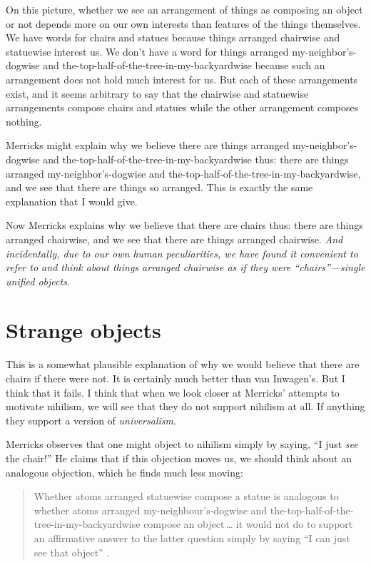 \documentclass[12pt,twoside]{reedfancy}
\begin{document}
\begin{spacing}{1.25}
On this picture, whether we see an arrangement of things as composing
an object or not depends more on our own interests than features of
the things themselves.  We have words for chairs and statues because
things arranged chairwise and statuewise interest us.  We don't have a
word for things arranged my-neighbor's-dogwise and
the-top-half-of-the-tree-in-my-backyardwise because such an
arrangement does not hold much interest for us.  But each of these
arrangements exist, and it seems arbitrary to say that the chairwise
and statuewise arrangements compose chairs and statues while the other
arrangement composes nothing.

Merricks might explain why we believe there are things arranged
my-neighbor's-dogwise and the-top-half-of-the-tree-in-my-backyardwise
thus: there are things arranged my-neighbor's-dogwise and
the-top-half-of-the-tree-in-my-backyardwise, and we see that there are
things so arranged.  This is exactly the same explanation that I would
give.

Now Merricks explains why we believe that there are chairs thus: there
are things arranged chairwise, and we see that there are things
arranged chairwise.  {\em And incidentally, due to our own human
  peculiarities, we have found it convenient to refer to and think
  about things arranged chairwise as if they were ``chairs''---single
  unified objects}.

\section{Strange objects}
\label{dogbush}
This is a somewhat plausible explanation of why we would believe that
there are chairs if there were not.  It is certainly much better than
van Inwagen's.  But I think that it fails.  I think that when we look
closer at Merricks' attempts to motivate nihilism, we will see that
they do not support nihilism at all.  If anything they support a
version of {\em universalism}.

Merricks observes that one might object to nihilism simply by saying,
``I just {\em see} the chair!''  He claims that if this objection
moves us, we should think about an analogous objection, which he finds
much less moving:

\begin{quote}
Whether atoms arranged statuewise compose a statue is analogous to
whether atoms arranged my-neighbour's-dogwise and
the-top-half-of-the-tree-in-my-backyardwise compose an object\,\ldots
it would not do to support an affirmative answer to the latter
question simply by saying ``I can just see that object''
\citeyearpar[73]{merricks2001a}.
\end{quote}


\end{spacing}
\end{document}
